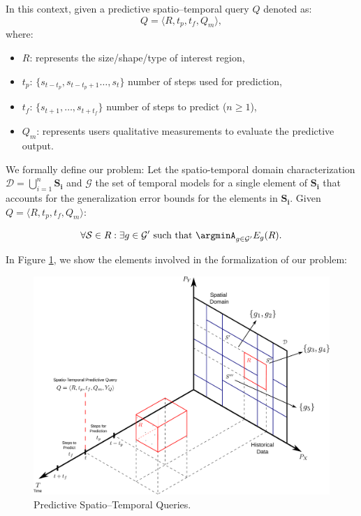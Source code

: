 \noindent In this context, given a predictive spatio--temporal query $Q$ denoted as:
\begin{equation} \label{eq:predictivequery}
Q = \langle R, t_{p}, t_{f}, Q_{m} \rangle,
\end{equation}
where:
\begin{itemize}[noitemsep,nolistsep]	
	\item $R$: represents the size/shape/type of interest region,
	\item $t_{p}$: $\{s_{t-t_p}, s_{t-t_{p}+1}\ldots, s_{t}\}$ number of steps used for  prediction,
	\item $t_{f}$: $\{s_{t+1}, \ldots, s_{t+t_f}\}$ number of steps to predict ($n\geq 1$),
	\item $Q_{m}$: represents users qualitative measurements to evaluate the predictive output.
\end{itemize}

We formally define our problem: Let the spatio-temporal domain characterization $\mathcal{D} = \bigcup_{i=1}^{n} \mathbf{S_i}$ and $\mathcal{G}$ the set of temporal models for a single element of $\mathbf{S_i}$ that accounts for the generalization error bounds for the elements in $\mathbf{S_i}$. Given $Q = \langle R, t_{p}, t_{f}, Q_{m} \rangle$:

\begin{equation}
\forall \mathcal{S} \in R: \exists g \in \mathcal{G'} \,\,\textrm{such that} \,\, \argminA_{g\in\mathcal{G'}} E_{g}(R).
\end{equation}

\noindent In Figure \ref{fig:time-series}, we show the elements involved in the formalization of our problem:
\begin{figure}[htb]
	\centering
	\includegraphics[scale=0.25]{../Figures/RepresentationTimeSeries}
	\caption{Predictive Spatio--Temporal Queries.}
	\label{fig:time-series}
\end{figure}


